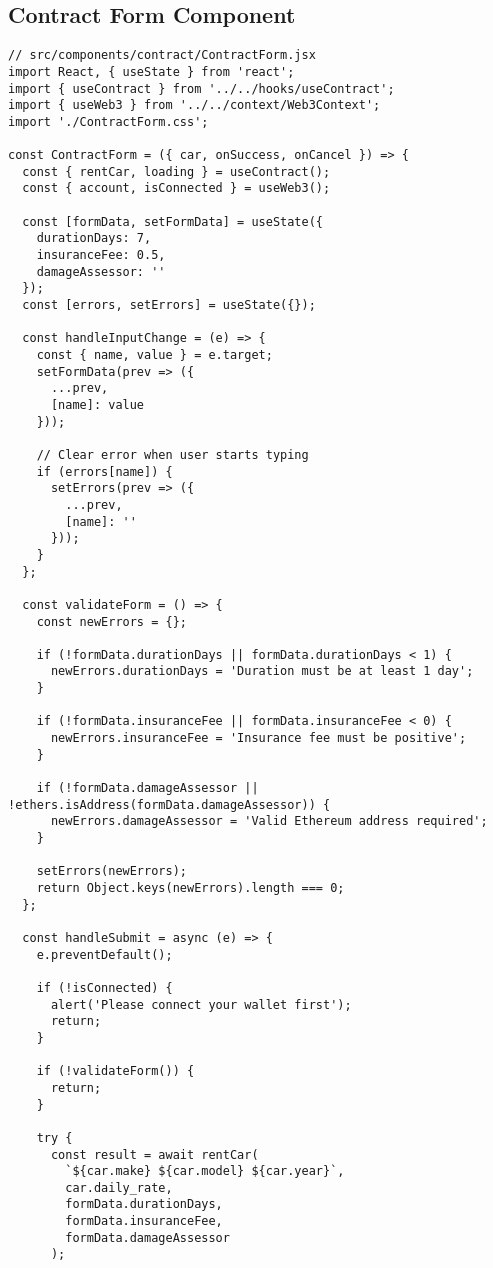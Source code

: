 \documentclass[12pt,a4paper]{article}
\begin{document}
\subsection{Contract Form Component}
\begin{lstlisting}[caption=ContractForm Component]
// src/components/contract/ContractForm.jsx
import React, { useState } from 'react';
import { useContract } from '../../hooks/useContract';
import { useWeb3 } from '../../context/Web3Context';
import './ContractForm.css';

const ContractForm = ({ car, onSuccess, onCancel }) => {
  const { rentCar, loading } = useContract();
  const { account, isConnected } = useWeb3();
  
  const [formData, setFormData] = useState({
    durationDays: 7,
    insuranceFee: 0.5,
    damageAssessor: ''
  });
  const [errors, setErrors] = useState({});

  const handleInputChange = (e) => {
    const { name, value } = e.target;
    setFormData(prev => ({
      ...prev,
      [name]: value
    }));
    
    // Clear error when user starts typing
    if (errors[name]) {
      setErrors(prev => ({
        ...prev,
        [name]: ''
      }));
    }
  };

  const validateForm = () => {
    const newErrors = {};

    if (!formData.durationDays || formData.durationDays < 1) {
      newErrors.durationDays = 'Duration must be at least 1 day';
    }

    if (!formData.insuranceFee || formData.insuranceFee < 0) {
      newErrors.insuranceFee = 'Insurance fee must be positive';
    }

    if (!formData.damageAssessor || !ethers.isAddress(formData.damageAssessor)) {
      newErrors.damageAssessor = 'Valid Ethereum address required';
    }

    setErrors(newErrors);
    return Object.keys(newErrors).length === 0;
  };

  const handleSubmit = async (e) => {
    e.preventDefault();
    
    if (!isConnected) {
      alert('Please connect your wallet first');
      return;
    }

    if (!validateForm()) {
      return;
    }

    try {
      const result = await rentCar(
        `${car.make} ${car.model} ${car.year}`,
        car.daily_rate,
        formData.durationDays,
        formData.insuranceFee,
        formData.damageAssessor
      );


\end{lstlisting}
\end{document}

